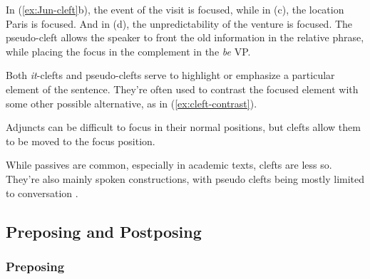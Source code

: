 \ea \label{ex:Jun-cleft}
    \z
\z

In (\ref{ex:Jun-cleft}b), the event of the visit is focused, while in (c), the location Paris is focused. And in (d), the unpredictability of the venture is focused. The pseudo-cleft allows the speaker to front the old information in the relative phrase, while placing the focus in the complement in the \textit{be} VP.

Both \textit{it}-clefts and pseudo-clefts serve to highlight or emphasize a particular element of the sentence. They're often used to contrast the focused element with some other possible alternative, as in (\ref{ex:cleft-contrast}).

\ea \label{ex:cleft-contrast}
    \z
\z
{}

Adjuncts can be difficult to focus in their normal positions, but clefts allow them to be moved to the focus position.

\ea\label{ex:adjuct-focus}
    \z
\ex\label{ex:adjunct-focus2}
    \z
\z

While passives are common, especially in academic texts, clefts are less so. They're also mainly spoken constructions, with pseudo clefts being mostly limited to conversation \citep[938]{Biber1999}.

\subsection{Preposing and Postposing}

\subsubsection*{Preposing}\label{sec:preposing}

